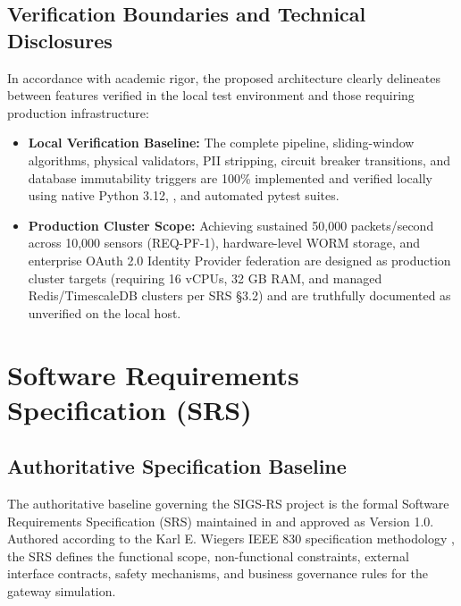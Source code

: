 \documentclass[a4paper]{article}
\begin{document}
\subsection{Verification Boundaries and Technical Disclosures}
In accordance with academic rigor, the proposed architecture clearly delineates between features verified in the local test environment and those requiring production infrastructure:
\begin{itemize}
    \item \textbf{Local Verification Baseline:} The complete pipeline, sliding-window algorithms, physical validators, PII stripping, circuit breaker transitions, and database immutability triggers are 100\% implemented and verified locally using native Python 3.12, , and automated pytest suites.
    \item \textbf{Production Cluster Scope:} Achieving sustained 50,000 packets/second across 10,000 sensors (REQ-PF-1), hardware-level WORM storage, and enterprise OAuth 2.0 Identity Provider federation are designed as production cluster targets (requiring 16 vCPUs, 32 GB RAM, and managed Redis/TimescaleDB clusters per SRS §3.2) and are truthfully documented as unverified on the local host.
\end{itemize}

\section{Software Requirements Specification (SRS)}

\subsection{Authoritative Specification Baseline}
The authoritative baseline governing the SIGS-RS project is the formal Software Requirements Specification (SRS) maintained in  and approved as Version 1.0. Authored according to the Karl E. Wiegers IEEE 830 specification methodology \cite{wiegers_srs}, the SRS defines the functional scope, non-functional constraints, external interface contracts, safety mechanisms, and business governance rules for the gateway simulation.
\end{document}

